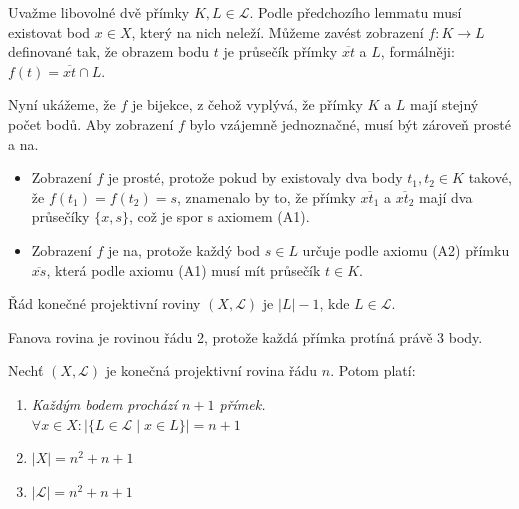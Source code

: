 \begin{t_proof}
  Uvažme libovolné dvě přímky $K, L\in\mathcal{L}$. Podle předchozího lemmatu musí existovat bod $x\in X$, který na nich neleží. Můžeme zavést zobrazení $f:K\rightarrow L$ definované tak, že obrazem bodu $t$ je průsečík přímky $\overline{xt}$ a $L$, formálněji: $f(t)=\overline{xt}\cap L$. 
  
  Nyní ukážeme, že $f$ je bijekce, z čehož vyplývá, že přímky $K$ a $L$ mají stejný počet bodů. Aby zobrazení $f$ bylo vzájemně jednoznačné, musí být zároveň prosté a na. 
  \begin{itemize}
    \item
    Zobrazení $f$ je prosté, protože pokud by existovaly dva body $t_1, t_2\in K$ takové, že $f(t_1)=f(t_2)=s$, znamenalo by to, že přímky $\overline{xt_1}$ a $\overline{xt_2}$ mají dva průsečíky $\{x,s\}$, což je spor s axiomem (A1).
    
    \item
    Zobrazení $f$ je na, protože každý bod $s\in L$ určuje podle axiomu (A2) přímku $\overline{xs}$, která podle axiomu (A1) musí mít průsečík $t\in K$.
  \end{itemize}
\end{t_proof}

\begin{t_definition}
  Řád konečné projektivní roviny $(X,\mathcal{L})$ je $|L|-1$, kde $L\in\mathcal{L}$.
\end{t_definition}

\begin{t_example}
  Fanova rovina je rovinou řádu 2, protože každá přímka protíná právě 3 body.
\end{t_example}

\begin{t_theorem}
  Nechť $(X,\mathcal{L})$ je konečná projektivní rovina řádu $n$. Potom platí:
  \begin{enumerate}
    \item
    \textit{Každým bodem prochází $n+1$ přímek.}
    \\$\forall x\in X:|\{L\in\mathcal{L}\mid x\in L\}| = n+1$
    
    \item
    $|X|=n^2+n+1$
    
    \item
    $|\mathcal{L}|=n^2+n+1$
  \end{enumerate}
\end{t_theorem}

